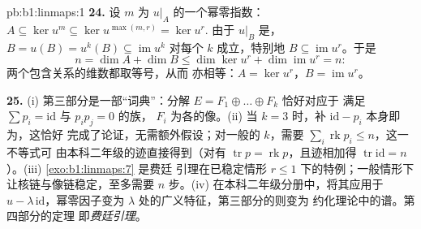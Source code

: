 \begin{solution}{pb:b1:linmaps:1}
\textbf{24.} 设 $m$ 为 $u|_A$ 的一个幂零指数：$A
\subseteq \ker u^{m} \subseteq \ker u^{\max(m,r)} = \ker u^{r}$.
由于 $u|_B$ 是，$B = u(B) = u^{k}(B) \subseteq
\operatorname{im} u^{k}$ 对每个 $k$ 成立，特别地 $B
\subseteq \operatorname{im} u^{r}$。于是
\[
n = \dim A + \dim B \leq \dim\ker u^{r} +
\dim\operatorname{im} u^{r} = n :
\]
两个包含关系的维数都取等号，从而
亦相等：$A = \ker u^{r}$，$B = \operatorname{im} u^{r}$。

\textbf{25.} (i) 第三部分是一部“词典”：分解 $E = F_1
\oplus \dots \oplus F_k$ 恰好对应于
满足 $\sum p_i = \mathrm{id}$ 与 $p_i p_j = 0$ 的族，
$F_i$ 为各的像。(ii) 当 $k = 3$ 时，补
$\mathrm{id} - p_i$ 本身即为，这恰好
完成了论证，无需额外假设；对一般的 $k$，需要
$\sum_i \operatorname{rk} p_i \leq n$，这一不等式可
由本科二年级的迹直接得到（对有 $\operatorname{tr} p = \operatorname{rk}
p$，且迹相加得 $\operatorname{tr}
\mathrm{id} = n$）。(iii) \cref{exo:b1:linmaps:7} 是费廷
引理在已稳定情形 $r \leq 1$ 下的特例；一般情形下
让核链与像链稳定，至多需要 $n$
步。(iv) 在本科二年级分册中，将其应用于 $u - \lambda\,
\mathrm{id}$，幂零因子变为
$\lambda$ 处的广义特征，第三部分的则变为
约化理论中的谱。第四部分的定理
即\emph{费廷引理}。
\end{solution}
